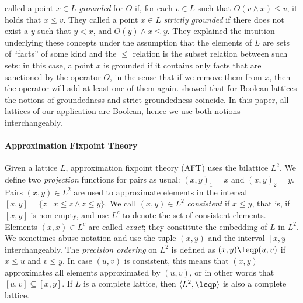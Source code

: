  called a point  $x\in L$ \emph{grounded} for $O$ if, for each $v\in L$ such that $O(v\land x)\leq v$, it holds that $x\leq v$. They called a point $x\in L$ \emph{strictly grounded} if there does not exist a $y$ such that $y<x$, and $O(y)\land x \leq y$. 
They explained the intuition underlying these concepts under the assumption that the elements of $L$ are sets of ``facts'' of some kind and the $\leq$ relation is the subset relation between such sets:
in this case, a point $x$ is grounded if it contains only facts that are sanctioned by the operator $O$, 
in the sense that if we remove them from $x$, then the operator will add at least one of them again. 
\citet{phd/Bogaerts15} showed that for Boolean lattices the notions of groundedness and strict groundedness coincide. In this paper, all lattices of our application are Boolean, hence we use both notions interchangeably.

\paragraph{Approximation Fixpoint Theory}


Given a lattice $L$, approximation fixpoint theory (AFT) \cite{DeneckerMT00} uses the bilattice 
$L^2$.  We define two \emph{projection} functions for pairs as usual:
$(x,y)_1=x$ and $(x,y)_2=y$.  Pairs $(x,y)\in L^2$ are used to
approximate elements in the interval $[x,y] = \{z\mid x\leq
z\wedge z\leq y\}$. We call $(x,y)\in L^2$ \emph{consistent} if $x\leq 
y$, that is, if $[x,y]$ is non-empty, and use $L^c$ to denote the set
of consistent elements. Elements $(x,x) \in L^c$ are called
\emph{exact}; they constitute the embedding of $L$ in $L^2$.  We sometimes abuse notation and use the tuple $(x,y)$
and the interval $[x,y]$ interchangeably.  The \emph{precision
  ordering} on $L^2$ is defined as $(x,y) \leqp (u,v)$ if $x\leq u$
and $v\leq y$. In case $(u,v)$ is consistent, this means that $(x,y)$
approximates all elements approximated by $(u,v)$, or in other words
that $[u,v]\subseteq [x,y]$.  If $L$ is a complete lattice, then
$\langle L^2,\leqp\rangle$ is also a complete lattice.
  
